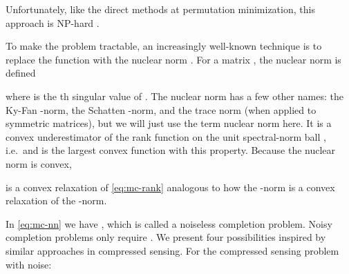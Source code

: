 \documentclass{sig-alternate}
\renewcommand{\cite}{\citep}
\begin{document}
Unfortunately, like the direct
methods at permutation minimization, this approach 
is NP-hard \cite{vandenberghe1996-semidefinite}.

To make the problem tractable, an increasingly well-known technique is
to replace the  function with the nuclear norm
 \cite{fazel2002-phdthesis}.
For a matrix , the nuclear norm is defined 

where  is the th singular value of
.
The nuclear norm has a few other names:
the Ky-Fan -norm, the Schatten -norm,
and the trace norm (when applied to symmetric matrices),
but we will just use the term nuclear norm here.
It is a convex underestimator of the
rank function on the unit spectral-norm ball , i.e.\ 
and is the largest convex function with this property.
Because the nuclear norm is convex,

is a convex relaxation of \eqref{eq:mc-rank}
analogous to how the -norm is a convex
relaxation of the -norm.  

In \eqref{eq:mc-nn}
we have , which is called a
noiseless completion problem.  Noisy completion
problems only require .  
We present four possibilities inspired by similar
approaches in compressed sensing.
For the compressed sensing problem with noise:
\end{document}
